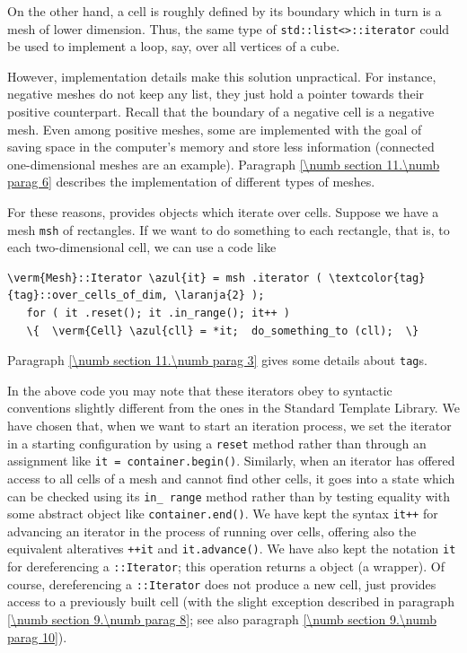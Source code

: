 On the other hand, a cell is roughly defined by its boundary which in turn is a mesh of
lower dimension.
Thus, the same type of {\small\tt std::list<>::iterator} could be used to
implement a loop, say, over all vertices of a cube.

However, implementation details make this solution unpractical.
For instance, negative meshes do not keep any list,
they just hold a pointer towards their positive counterpart.
Recall that the boundary of a negative cell is a negative mesh.
Even among positive meshes, some are implemented with the goal of saving space in the
computer's memory and store less information (connected one-dimensional meshes are an
example).
Paragraph \ref{\numb section 11.\numb parag 6} describes the implementation of different
types of meshes.

For these reasons, {\maniFEM} provides objects which iterate over cells.
Suppose we have a mesh {\small\tt msh} of rectangles.
If we want to do something to each rectangle, that is, to each two-dimensional cell,
we can use a code like

\begin{Verbatim}[commandchars=\\\{\},formatcom=\small\tt,
   baselinestretch=0.94,framesep=2mm                      ]
   \verm{Mesh}::Iterator \azul{it} = msh .iterator ( \textcolor{tag}{tag}::over_cells_of_dim, \laranja{2} );
   for ( it .reset(); it .in_range(); it++ )
   \{  \verm{Cell} \azul{cll} = *it;  do_something_to (cll);  \}
\end{Verbatim}

Paragraph \ref{\numb section 11.\numb parag 3} gives some details about {\small\tt\textcolor{tag}{tag}}s.

In the above code you may note that these iterators obey to syntactic conventions
slightly different from the ones in the Standard Template Library.
We have chosen that, when we want to start an iteration process, we set the iterator in
a starting configuration by using a {\small\tt reset} method rather than through an assignment
like {\small\tt it = container.begin()}.
Similarly, when an iterator has offered access to all cells of a mesh and cannot find
other cells, it goes into a state which can be checked using its {\small\tt in\_\,range} method
rather than by testing equality with some abstract object like {\small\tt container.end()}.
We have kept the syntax {\small\tt it++} for advancing an iterator in the process of
running over cells, offering also the equivalent alteratives {\small\tt ++it} and
{\small\tt it.advance()}.
We have also kept the notation {\small\tt *it} for dereferencing a
{\small\tt {}::Iterator};
this operation returns a {\small\tt {}} object (a wrapper).
Of course, dereferencing a {\small\tt {}::Iterator} does not produce a new cell,
just provides access to a previously built cell
(with the slight exception described in paragraph \ref{\numb section 9.\numb parag 8};
see also paragraph \ref{\numb section 9.\numb parag 10}).

